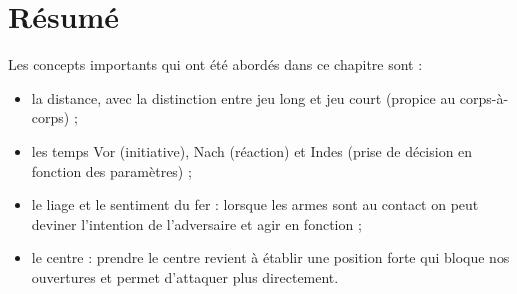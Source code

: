 \section{Résumé}


\noindent
Les concepts importants qui ont été abordés dans ce chapitre sont :
\begin{itemize}
	\item la distance, avec la distinction entre jeu long et jeu court (propice au corps-à-corps) ;
	
	\item les temps Vor (initiative), Nach (réaction) et Indes (prise de décision en fonction des paramètres) ;
	
	\item le liage et le sentiment du fer : lorsque les armes sont au contact on peut deviner l'intention de l'adversaire et agir en fonction ;
	
	\item le centre : prendre le centre revient à établir une position forte qui bloque nos ouvertures et permet d'attaquer plus directement.
\end{itemize}

